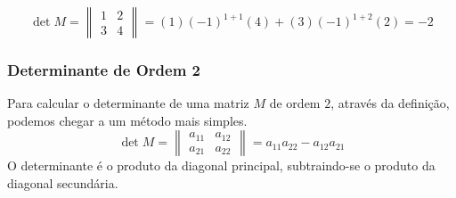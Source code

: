 \begin{exemplo}
\[\det M=\begin{Vmatrix}
1 & 2 \\
3 & 4
\end{Vmatrix}=(1)(-1)^{1+1}(4)+(3)(-1)^{1+2}(2)=-2\]
\end{exemplo}
\subsubsection{Determinante de Ordem 2}
Para calcular o determinante de uma matriz $M$ de ordem $2$, através da definição, podemos chegar a um método mais simples.
\[\det M=\begin{Vmatrix}
a_{11} & a_{12}\\
a_{21} & a_{22}
\end{Vmatrix}=a_{11}a_{22}-a_{12}a_{21}\]
O determinante é o produto da diagonal principal, subtraindo-se o produto da diagonal secundária.
